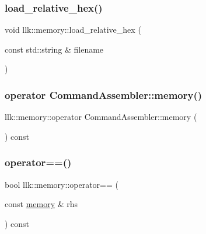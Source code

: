 \subsubsection{\texorpdfstring{load\+\_\+relative\+\_\+hex()}{load\_relative\_hex()}}
{\footnotesize\ttfamily void llk\+::memory\+::load\+\_\+relative\+\_\+hex (\begin{DoxyParamCaption}\item[{const std\+::string \&}]{filename }\end{DoxyParamCaption})}

\mbox{\label{classllk_1_1memory_a68a9ba98730a540ab25d5c21e9501790}} 
\subsubsection{\texorpdfstring{operator Command\+Assembler\+::memory()}{operator CommandAssembler::memory()}}
{\footnotesize\ttfamily llk\+::memory\+::operator Command\+Assembler\+::memory (\begin{DoxyParamCaption}{ }\end{DoxyParamCaption}) const\hspace{0.3cm}{\ttfamily [inline]}}

\mbox{\label{classllk_1_1memory_a268d76a85a246184d5f1d9bb00b57712}} 
\subsubsection{\texorpdfstring{operator==()}{operator==()}}
{\footnotesize\ttfamily bool llk\+::memory\+::operator== (\begin{DoxyParamCaption}\item[{const \hyperlink{classllk_1_1memory}{memory} \&}]{rhs }\end{DoxyParamCaption}) const\hspace{0.3cm}{\ttfamily [inline]}}

\mbox{\label{classllk_1_1memory_a8227a4de6153b8814568474726d02f24}} 
